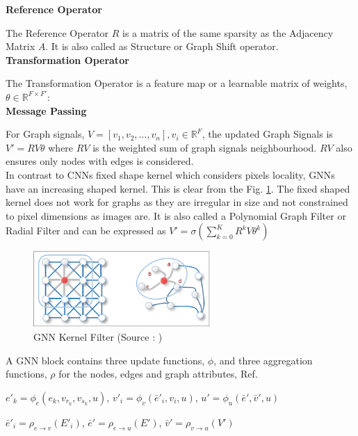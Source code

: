 \documentclass{report} %
\begin{document}
\textbf{Reference Operator}

The Reference Operator \( R \) is a matrix of the same sparsity as the Adjacency Matrix \( A \). It is also called as Structure or Graph Shift operator.\\

\textbf{Transformation Operator}

The Transformation Operator is a feature map or a learnable matrix of weights, \( \theta \in \mathbb{R}^{F \times F'} \):\\

\textbf{Message Passing}

For Graph signals, \( V = [v_1, v_2, \dots, v_n], v_i  \in \mathbb{R}^F \), the updated Graph Signals is \( V' = RV\theta \) 
where \( RV \) is the weighted sum of graph signals neighbourhood. \( RV \) also ensures only nodes with edges is considered.\\

In contrast to \ac{CNN}s fixed shape kernel which considers pixels locality, \ac{GNN}s have an increasing shaped kernel. This is clear from the Fig. \ref{fig:GNN Kernel Filter}. 
The fixed shaped kernel does not work for graphs  as they are irregular in size and not constrained to pixel dimensions as images are. 
It is also called a Polynomial Graph Filter or Radial Filter and can be expressed as $V' = \sigma (\sum_{k=0}^{K}R^{k}V\theta^{k})$ 

\begin{figure}[H]
    \centering
    \includegraphics[width=0.6\textwidth]{./ReportImages/GNNKernel.png} 
    \caption{\ac{GNN} Kernel Filter (Source : \cite{GNN-2019})}
    \label{fig:GNN Kernel Filter}
\end{figure}

A \ac{GNN} block contains three update functions, \( \phi \), and three aggregation functions, \( \rho \) for the nodes, edges and graph attributes, Ref. \cite{GNNs-2018}

$e'_k = \phi_e(e_k, v_{r_k}, v_{s_k}, u)$, $v'_i = \phi_v(\bar{e}'_i, v_i, u)$, $u' = \phi_u(\bar{e}', \bar{v}', u)$

$\bar{e}'_i = \rho_{e \to v}(E'_i)$, $\bar{e}' = \rho_{e \to u}(E')$, $\bar{v}' = \rho_{v \to u}(V')$
\end{document}
